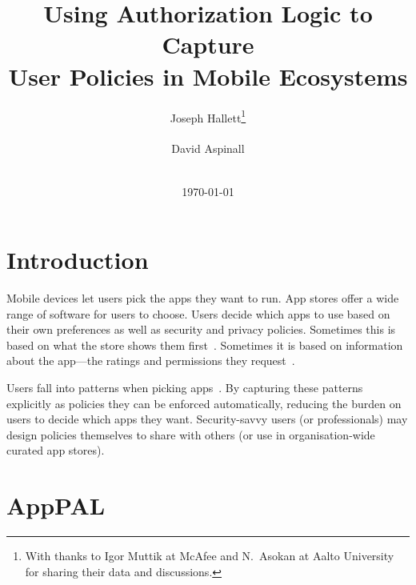 \documentclass[]{soups-poster}
\newcommand{\citep}[1]{\cite{#1}}
\begin{document}
\title{Using Authorization Logic to Capture\\User Policies in Mobile Ecosystems}
\author{%
  \alignauthor{}
  Joseph Hallett\thanks{With thanks to Igor Muttik at McAfee and N{.}~Asokan at Aalto University for sharing their data and discussions.}\\
  \\
  \alignauthor{}
  David Aspinall\\
  \\
}
\date\today
\maketitle

\section{Introduction}

Mobile devices let users pick the apps they want to run.
App stores offer a wide range of software for users to choose.
Users decide which apps to use based on their own preferences as well as security and privacy policies. %
Sometimes this is based on what the store shows them first~\citep{Prata:2012in}.
Sometimes it is based on information about the app---the ratings and permissions they
request~\citep{Kelley:2013kc}.

Users fall into patterns when picking apps~\citep{Sadeh:2014vq}.
By capturing these patterns explicitly as policies they can be enforced
automatically, reducing the burden on users to decide which apps they want.
Security-savvy users (or professionals) may design policies themselves
to share with others (or use in organisation-wide curated app stores).

%

\section{AppPAL}
\end{document}
